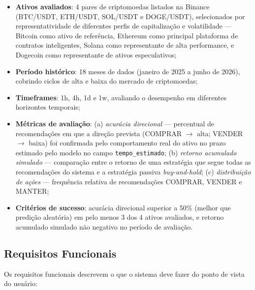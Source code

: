 \documentclass[conference]{IEEEtran}
\begin{document}
\begin{itemize}
  \item \textbf{Ativos avaliados}: 4 pares de criptomoedas listados na Binance (BTC/USDT, ETH/USDT, SOL/USDT e DOGE/USDT), selecionados por representatividade de diferentes perfis de capitalização e volatilidade --- Bitcoin como ativo de referência, Ethereum como principal plataforma de contratos inteligentes, Solana como representante de alta performance, e Dogecoin como representante de ativos especulativos;
  \item \textbf{Período histórico}: 18 meses de dados (janeiro de 2025 a junho de 2026), cobrindo ciclos de alta e baixa do mercado de criptomoedas;
  \item \textbf{Timeframes}: 1h, 4h, 1d e 1w, avaliando o desempenho em diferentes horizontes temporais;
  \item \textbf{Métricas de avaliação}: (a) \textit{acurácia direcional} --- percentual de recomendações em que a direção prevista (COMPRAR $\rightarrow$ alta; VENDER $\rightarrow$ baixa) foi confirmada pelo comportamento real do ativo no prazo estimado pelo modelo no campo \texttt{tempo\_estimado}; (b) \textit{retorno acumulado simulado} --- comparação entre o retorno de uma estratégia que segue todas as recomendações do sistema e a estratégia passiva \textit{buy-and-hold}; (c) \textit{distribuição de ações} --- frequência relativa de recomendações COMPRAR, VENDER e MANTER;
  \item \textbf{Critérios de sucesso}: acurácia direcional superior a 50\% (melhor que predição aleatória) em pelo menos 3 dos 4 ativos avaliados, e retorno acumulado simulado não negativo no período de avaliação.
\end{itemize}

\subsection{Requisitos Funcionais}
\label{sec:requisitos}

Os requisitos funcionais descrevem o que o sistema deve fazer do ponto de vista do usuário:
\end{document}
